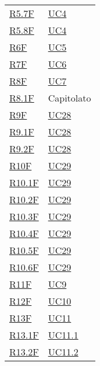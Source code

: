 \begin{center}
\begin{longtable}[!h]{p{50px} p{50px}}
        \hyperref[tab:RequisitiFunzionali]{R5.7F}    & \hyperref[sec:UC4]{UC4}       \\
        \hyperref[tab:RequisitiFunzionali]{R5.8F}    & \hyperref[sec:UC4]{UC4}       \\
        \hyperref[tab:RequisitiFunzionali]{R6F}      & \hyperref[sec:UC5]{UC5}       \\
        \hyperref[tab:RequisitiFunzionali]{R7F}      & \hyperref[sec:UC6]{UC6}       \\
        \hyperref[tab:RequisitiFunzionali]{R8F}      & \hyperref[sec:UC7]{UC7}       \\
        \hyperref[tab:RequisitiFunzionali]{R8.1F}    & Capitolato                    \\
        \hyperref[tab:RequisitiFunzionali]{R9F}      & \hyperref[sec:UC28]{UC28}     \\
        \hyperref[tab:RequisitiFunzionali]{R9.1F}    & \hyperref[sec:UC28]{UC28}     \\
        \hyperref[tab:RequisitiFunzionali]{R9.2F}    & \hyperref[sec:UC28]{UC28}     \\
        \hyperref[tab:RequisitiFunzionali]{R10F}     & \hyperref[sec:UC29]{UC29}     \\
        \hyperref[tab:RequisitiFunzionali]{R10.1F}   & \hyperref[sec:UC29]{UC29}     \\
        \hyperref[tab:RequisitiFunzionali]{R10.2F}   & \hyperref[sec:UC29]{UC29}     \\
        \hyperref[tab:RequisitiFunzionali]{R10.3F}   & \hyperref[sec:UC29]{UC29}     \\
        \hyperref[tab:RequisitiFunzionali]{R10.4F}   & \hyperref[sec:UC29]{UC29}     \\
        \hyperref[tab:RequisitiFunzionali]{R10.5F}   & \hyperref[sec:UC29]{UC29}     \\
        \hyperref[tab:RequisitiFunzionali]{R10.6F}   & \hyperref[sec:UC29]{UC29}     \\
        \hyperref[tab:RequisitiFunzionali]{R11F}     & \hyperref[sec:UC9]{UC9}       \\
        \hyperref[tab:RequisitiFunzionali]{R12F}     & \hyperref[sec:UC10]{UC10}     \\
        \hyperref[tab:RequisitiFunzionali]{R13F}     & \hyperref[sec:UC11]{UC11}     \\
        \hyperref[tab:RequisitiFunzionali]{R13.1F}   & \hyperref[sec:UC11.1]{UC11.1} \\
        \hyperref[tab:RequisitiFunzionali]{R13.2F}   & \hyperref[sec:UC11.2]{UC11.2} \\

\end{longtable}
\end{center}
